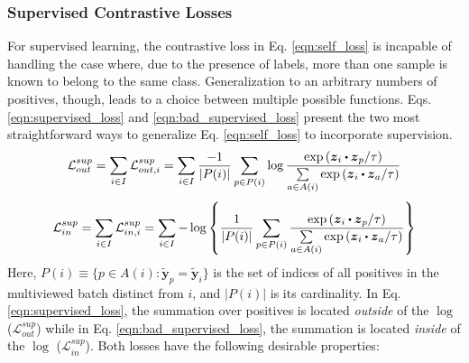\subsubsection{Supervised Contrastive Losses}
For supervised learning, the contrastive loss in Eq. \ref{eqn:self_loss} is incapable of handling the case where, due to the presence of labels, more than one sample is known to belong to the same class. Generalization to an arbitrary numbers of positives, though, leads to a choice between multiple possible functions. Eqs. \ref{eqn:supervised_loss} and \ref{eqn:bad_supervised_loss} present the two most straightforward ways to generalize Eq. \ref{eqn:self_loss} to incorporate supervision.
\begin{equation}
  \mathcal{L}_{out}^{sup}
  =\sum_{i\in I}\mathcal{L}_{out,i}^{sup}
  =\sum_{i\in I}\frac{-1}{|P(i)|}\sum_{p\in P(i)}\log{\frac{\text{exp}\left(\boldsymbol{z}_i\bigcdot\boldsymbol{z}_p/\tau\right)}{\sum\limits_{a\in A(i)}\text{exp}\left(\boldsymbol{z}_i\bigcdot\boldsymbol{z}_a/\tau\right)}}
  \label{eqn:supervised_loss}
\end{equation}
\begin{equation}
  \mathcal{L}_{in}^{sup}
  =\sum_{i\in I}\mathcal{L}_{in,i}^{sup}
  =\sum_{i\in I}-\log\left\{\frac{1}{|P(i)|}\sum_{p\in P(i)}\frac{\text{exp}\left(\boldsymbol{z}_i\bigcdot\boldsymbol{z}_p/\tau\right)}{\sum\limits_{a\in A(i)}\text{exp}\left(\boldsymbol{z}_i\bigcdot\boldsymbol{z}_a/\tau\right)}\right\}
  \label{eqn:bad_supervised_loss}
\end{equation}
Here, $P(i)\equiv\{p\in A(i):\boldsymbol{\tilde{y}}_p=\boldsymbol{\tilde{y}}_i\}$ is the set of indices of all positives in the multiviewed batch distinct from $i$, and $|P(i)|$ is its cardinality. In Eq. \ref{eqn:supervised_loss}, the summation over positives is located \emph{outside} of the $\log$ ($\mathcal{L}_{out}^{sup}$) while in Eq. \ref{eqn:bad_supervised_loss}, the summation is located \emph{inside} of the $\log$ ($\mathcal{L}_{in}^{sup}$). Both losses have the following desirable properties:

